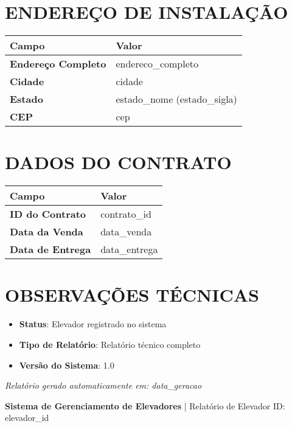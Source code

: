 \documentclass[a4paper,11pt]{article}
\begin{document}
\section*{ENDEREÇO DE INSTALAÇÃO}

\begin{tabular}{|L{4cm}|L{8cm}|}
  \hline
  \textbf{Campo} & \textbf{Valor} \\
  \hline
  \textbf{Endereço Completo} & {{endereco_completo}} \\
  \hline
  \textbf{Cidade} & {{cidade}} \\
  \hline
  \textbf{Estado} & {{estado_nome}} ({{estado_sigla}}) \\
  \hline
  \textbf{CEP} & {{cep}} \\
  \hline
\end{tabular}

\vspace{0.5cm}

\section*{DADOS DO CONTRATO}

\begin{tabular}{|L{4cm}|L{8cm}|}
  \hline
  \textbf{Campo} & \textbf{Valor} \\
  \hline
  \textbf{ID do Contrato} & {{contrato_id}} \\
  \hline
  \textbf{Data da Venda} & {{data_venda}} \\
  \hline
  \textbf{Data de Entrega} & {{data_entrega}} \\
  \hline
\end{tabular}

\vspace{0.5cm}

\section*{OBSERVAÇÕES TÉCNICAS}

\begin{itemize}
  \item \textbf{Status}: Elevador registrado no sistema
  \item \textbf{Tipo de Relatório}: Relatório técnico completo
  \item \textbf{Versão do Sistema}: 1.0
\end{itemize}

\vspace{1cm}

\begin{center}
  \small
  \textit{Relatório gerado automaticamente em: {{data_geracao}}}
  
  \textbf{Sistema de Gerenciamento de Elevadores} | Relatório de Elevador ID: {{elevador_id}}
\end{center}
\end{document}
